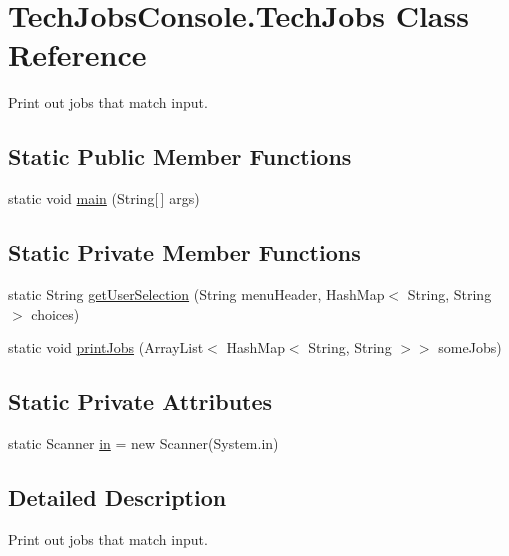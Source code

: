 \hypertarget{class_tech_jobs_console_1_1_tech_jobs}{}\section{Tech\+Jobs\+Console.\+Tech\+Jobs Class Reference}
\label{class_tech_jobs_console_1_1_tech_jobs}


Print out jobs that match input.  


\subsection*{Static Public Member Functions}
\begin{DoxyCompactItemize}
\item 
static void \mbox{\hyperlink{class_tech_jobs_console_1_1_tech_jobs_aca7466b1cc8ef93c94b62a62c656bfca}{main}} (String\mbox{[}$\,$\mbox{]} args)
\end{DoxyCompactItemize}
\subsection*{Static Private Member Functions}
\begin{DoxyCompactItemize}
\item 
static String \mbox{\hyperlink{class_tech_jobs_console_1_1_tech_jobs_aea72d04cffd1467dd68ce9bfee22cd64}{get\+User\+Selection}} (String menu\+Header, Hash\+Map$<$ String, String $>$ choices)
\item 
static void \mbox{\hyperlink{class_tech_jobs_console_1_1_tech_jobs_a90d0303939f42444950492f2c36925f1}{print\+Jobs}} (Array\+List$<$ Hash\+Map$<$ String, String $>$$>$ some\+Jobs)
\end{DoxyCompactItemize}
\subsection*{Static Private Attributes}
\begin{DoxyCompactItemize}
\item 
static Scanner \mbox{\hyperlink{class_tech_jobs_console_1_1_tech_jobs_ac953bc3b00bf00267a68193946c6a1b2}{in}} = new Scanner(System.\+in)
\end{DoxyCompactItemize}


\subsection{Detailed Description}
Print out jobs that match input. 

